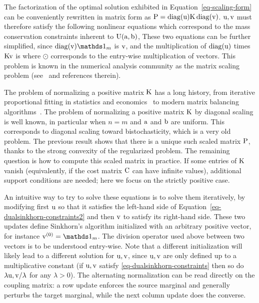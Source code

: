 The factorization of the optimal solution exhibited in Equation~\eqref{eq-scaling-form} can be conveniently rewritten in matrix form as $\P=\diag(\uD)\K\diag(\vD)$.
%
$\uD,\vD$ must therefore satisfy the following nonlinear equations which correspond to the mass conservation constraints inherent to $\CouplingsD(\a,\b)$,
These two equations can be further simplified, since $\diag(\vD)\ones_m$ is  $\vD$, and the multiplication of $\diag(\uD)$ times $\K \vD$ is
\eql{\label{eq-dualsinkhorn-constraints2}
	\uD \odot (\K \vD) = \a
	\qandq
	\vD \odot (\transp{\K}\uD) = \b
}
where $\odot$ corresponds to the entry-wise multiplication of vectors. This problem is known in the numerical analysis community as the matrix scaling problem (see~\cite{nemirovski1999complexity} and references therein).

The problem of normalizing a positive matrix $\K$ has a long history, from iterative proportional fitting in statistics and economics~\cite{kruithof,yule1912methods,Galichon-Entropic} to modern matrix balancing algorithms~\cite{ReviewSinkhorn,cohen2017matrix}.
%
The problem of normalizing a positive matrix $\K$ by diagonal scaling is well known, in particular when $n=m$ and $\a$ and $\b$ are uniform. This corresponds to diagonal scaling toward bistochasticity, which is a very old problem. The previous result shows that there is a unique such scaled matrix $\P$, thanks to the strong convexity of the regularized problem. The remaining question is how to compute this scaled matrix in practice. If some entries of $\K$ vanish (equivalently, if the cost matrix $\C$ can have infinite values), additional support conditions are needed; here we focus on the strictly positive case.


An intuitive way to try to solve these equations is to solve them iteratively, by modifying first $\uD$ so that it satisfies the left-hand side of Equation~\eqref{eq-dualsinkhorn-constraints2} and then $\vD$ to satisfy its right-hand side. These two updates define Sinkhorn's algorithm
\eql{\label{eq-sinkhorn}
	\itt{\uD} \eqdef \frac{\a}{\K \it{\vD}}
	\qandq
	\itt{\vD} \eqdef \frac{\b}{\transp{\K}\itt{\uD}},
}
initialized with an arbitrary positive vector, for instance $\init{\vD} = \ones_m$. The division operator used above between two vectors is to be understood entry-wise. Note that a different initialization will likely lead to a different solution for $\uD,\vD$, since $\uD,\vD$ are only defined up to a multiplicative constant (if $\uD,\vD$ satisfy \eqref{eq-dualsinkhorn-constraints} then so do $\lambda\uD,\vD/\lambda$ for any $\lambda>0$).
%
The alternating normalization can be read directly on the coupling matrix: a row update enforces the source marginal and generally perturbs the target marginal, while the next column update does the converse.

